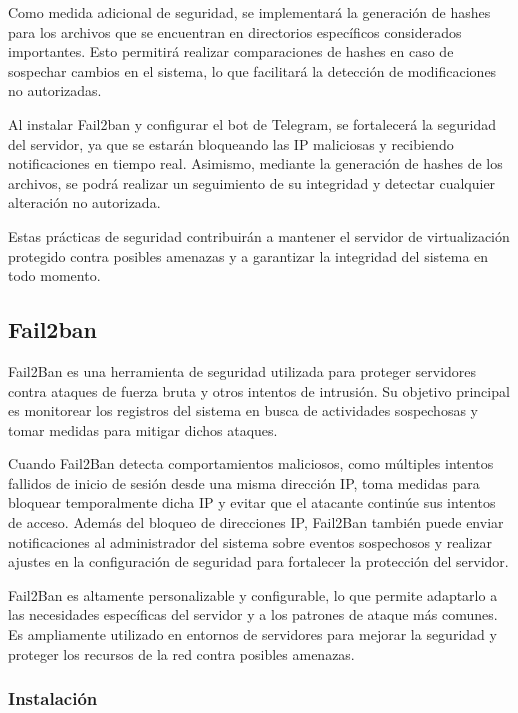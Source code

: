 		Como medida adicional de seguridad, se implementará la generación de hashes para los archivos que se encuentran en directorios específicos considerados importantes. Esto permitirá realizar comparaciones de hashes en caso de sospechar cambios en el sistema, lo que facilitará la detección de modificaciones no autorizadas.
		
		Al instalar Fail2ban y configurar el bot de Telegram, se fortalecerá la seguridad del servidor, ya que se estarán bloqueando las IP maliciosas y recibiendo notificaciones en tiempo real. Asimismo, mediante la generación de hashes de los archivos, se podrá realizar un seguimiento de su integridad y detectar cualquier alteración no autorizada.
		
		Estas prácticas de seguridad contribuirán a mantener el servidor de virtualización protegido contra posibles amenazas y a garantizar la integridad del sistema en todo momento.
		
	
		
		\subsection{Fail2ban}
		
			Fail2Ban es una herramienta de seguridad utilizada para proteger servidores contra ataques de fuerza bruta y otros intentos de intrusión. Su objetivo principal es monitorear los registros del sistema en busca de actividades sospechosas y tomar medidas para mitigar dichos ataques.\par

			Cuando Fail2Ban detecta comportamientos maliciosos, como múltiples intentos fallidos de inicio de sesión desde una misma dirección IP, toma medidas para bloquear temporalmente dicha IP y evitar que el atacante continúe sus intentos de acceso. Además del bloqueo de direcciones IP, Fail2Ban también puede enviar notificaciones al administrador del sistema sobre eventos sospechosos y realizar ajustes en la configuración de seguridad para fortalecer la protección del servidor.\par

			Fail2Ban es altamente personalizable y configurable, lo que permite adaptarlo a las necesidades específicas del servidor y a los patrones de ataque más comunes. Es ampliamente utilizado en entornos de servidores para mejorar la seguridad y proteger los recursos de la red contra posibles amenazas.\par

			\subsubsection{Instalación}
			

